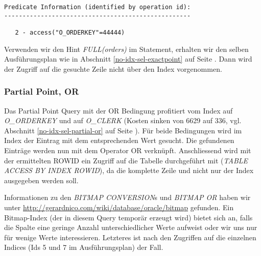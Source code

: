 \documentclass[11pt,a4paper,parskip=half]{scrartcl}
\begin{document}
\begin{lstlisting}
Predicate Information (identified by operation id):                                                                                                                                                                                                                                                          
---------------------------------------------------                                                                                                                                                                                                                                                          
                                                                                                                                                                                                                                                                                                             
   2 - access("O_ORDERKEY"=44444)    
\end{lstlisting}

Verwenden wir den Hint \emph{FULL(orders)} im Statement, erhalten wir den selben Ausführungsplan wie in Abschnitt \ref{no-idx-sel-exactpoint} auf Seite \pageref{no-idx-sel-exactpoint}. Dann wird der Zugriff auf die gesuchte Zeile nicht über den Index vorgenommen.

\subsubsection{Partial Point, OR}
\label{idx-sel-partial-or}
Das Partial Point Query mit der OR Bedingung profitiert vom Index auf \emph{O\_ORDERKEY} und auf \emph{O\_CLERK} (Kosten sinken von 6629 auf 336, vgl. Abschnitt \ref{no-idx-sel-partial-or} auf Seite \pageref{no-idx-sel-partial-or}). Für beide Bedingungen wird im Index der Eintrag mit dem entsprechenden Wert gesucht. Die gefundenen Einträge werden nun mit dem Operator OR verknüpft. Anschliessend wird mit der ermittelten ROWID ein Zugriff auf die Tabelle durchgeführt mit (\emph{TABLE ACCESS BY INDEX ROWID}), da die komplette Zeile und nicht nur der Index ausgegeben werden soll.

Informationen zu den \emph{BITMAP CONVERSION}s und \emph{BITMAP OR} haben wir unter \url{http://gerardnico.com/wiki/database/oracle/bitmap} gefunden. Ein Bitmap-Index (der in diesem Query temporär erzeugt wird) bietet sich an, falls die Spalte eine geringe Anzahl unterschiedlicher Werte aufweist oder wir uns nur für wenige Werte interessieren. Letzteres ist nach den Zugriffen auf die einzelnen Indices (Ids 5 und 7 im Ausführungsplan) der Fall.
\end{document}
